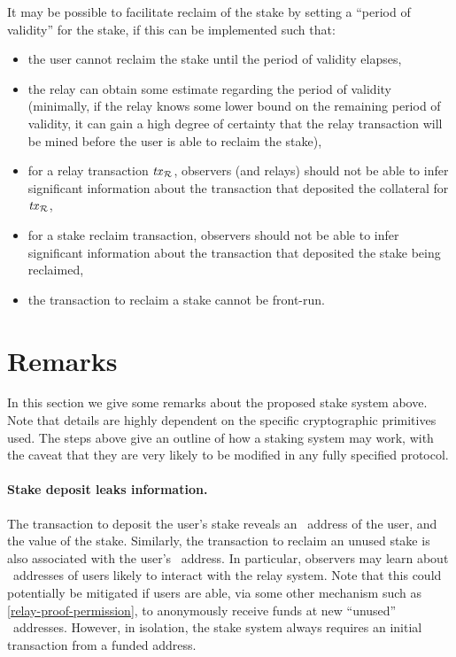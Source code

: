 It may be possible to facilitate reclaim of the stake by setting a ``period of validity'' for the stake, if this can be implemented such that:
\begin{itemize}
\item the user cannot reclaim the stake until the period of validity elapses,
\item the relay can obtain some estimate regarding the period of validity (minimally, if the relay knows some lower bound on the remaining period of validity, it can gain a high degree of certainty that the relay transaction will be mined before the user is able to reclaim the stake),
\item for a relay transaction $\mathit{tx}_{\mathcal{R}}$, observers (and relays) should not be able to infer significant information about the transaction that deposited the collateral for $\mathit{tx}_{\mathcal{R}}$,
\item for a stake reclaim transaction, observers should not be able to infer significant information about the transaction that deposited the stake being reclaimed,
\item the transaction to reclaim a stake cannot be front-run.
\end{itemize}

\section{Remarks}\label{relay-stake:remarks}

In this section we give some remarks about the proposed stake system above. Note that details are highly dependent on the specific cryptographic primitives used. The steps above give an outline of how a staking system may work, with the caveat that they are very likely to be modified in any fully specified protocol.

\paragraph{Stake deposit leaks information.} The transaction to deposit the user's stake reveals an \ethereum~address of the user, and the value of the stake.  Similarly, the transaction to reclaim an unused stake is also associated with the user's \ethereum~address. In particular, observers may learn about \ethereum~addresses of users likely to interact with the relay system. Note that this could potentially be mitigated if users are able, via some other mechanism such as \cref{relay-proof-permission}, to anonymously receive funds at new ``unused'' \ethereum~addresses. However, in isolation, the stake system always requires an initial transaction from a funded address.


